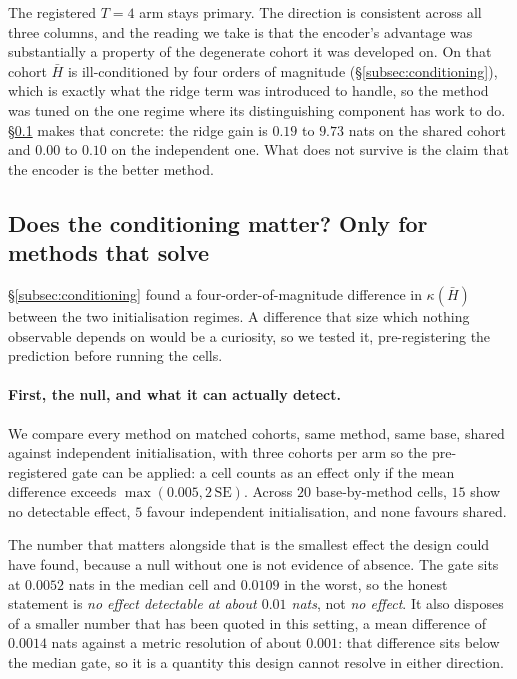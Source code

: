 The registered $T = 4$ arm stays primary. The direction is consistent
across all three columns, and the reading we take is that the encoder's
advantage was substantially a property of the degenerate cohort it was
developed on. On that cohort $\bar H$ is ill-conditioned by four
orders of magnitude (\S\ref{subsec:conditioning}), which is exactly what
the ridge term was introduced to handle, so the method was tuned on the one
regime where its distinguishing component has work to do.
\S\ref{subsec:ridge} makes that concrete: the ridge gain is $0.19$ to
$9.73$ nats on the shared cohort and $0.00$ to $0.10$ on the independent
one. What does not survive is the claim that the encoder is the better
method.

\subsection{Does the conditioning matter? Only for methods that solve}
\label{subsec:ridge}

\S\ref{subsec:conditioning} found a four-order-of-magnitude difference in
$\kappa(\bar H)$ between the two initialisation regimes. A difference that
size which nothing observable depends on would be a curiosity, so we tested
it, pre-registering the prediction before running the cells.

\paragraph{First, the null, and what it can actually detect.} We compare
every method on matched cohorts, same method, same base, shared against
independent initialisation, with three cohorts per arm so the
pre-registered gate can be applied: a cell counts as an effect only if the
mean difference exceeds $\max(0.005, 2\,\mathrm{SE})$. Across $20$
base-by-method cells, $15$ show no detectable effect, $5$ favour
independent initialisation, and none favours shared.

The number that matters alongside that is the smallest effect the design
could have found, because a null without one is not evidence of absence.
The gate sits at $0.0052$ nats in the median cell and $0.0109$ in the
worst, so the honest statement is \emph{no effect detectable at about
$0.01$ nats}, not \emph{no effect}. It also disposes of a smaller number
that has been quoted in this setting, a mean difference of $0.0014$ nats
against a metric resolution of about $0.001$: that difference sits below
the median gate, so it is a quantity this design cannot resolve in either
direction.

